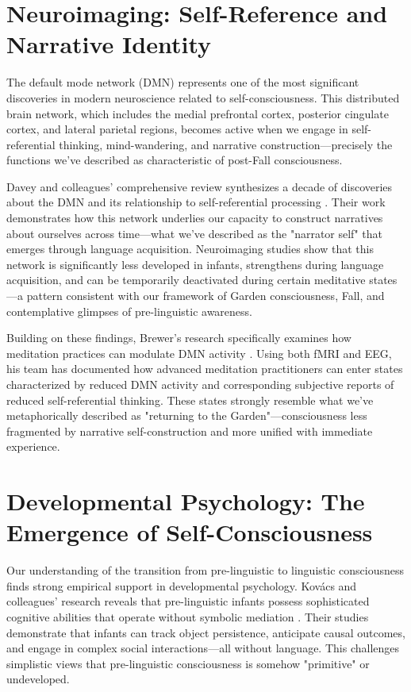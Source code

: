 \section{Neuroimaging: Self-Reference and Narrative Identity}

The default mode network (DMN) represents one of the most significant discoveries in modern neuroscience related to self-consciousness. This distributed brain network, which includes the medial prefrontal cortex, posterior cingulate cortex, and lateral parietal regions, becomes active when we engage in self-referential thinking, mind-wandering, and narrative construction—precisely the functions we've described as characteristic of post-Fall consciousness.

Davey and colleagues' comprehensive review synthesizes a decade of discoveries about the DMN and its relationship to self-referential processing \parencite{davey2024default}. Their work demonstrates how this network underlies our capacity to construct narratives about ourselves across time—what we've described as the "narrator self" that emerges through language acquisition. Neuroimaging studies show that this network is significantly less developed in infants, strengthens during language acquisition, and can be temporarily deactivated during certain meditative states—a pattern consistent with our framework of Garden consciousness, Fall, and contemplative glimpses of pre-linguistic awareness.

Building on these findings, Brewer's research specifically examines how meditation practices can modulate DMN activity \parencite{brewer2024meditation}. Using both fMRI and EEG, his team has documented how advanced meditation practitioners can enter states characterized by reduced DMN activity and corresponding subjective reports of reduced self-referential thinking. These states strongly resemble what we've metaphorically described as "returning to the Garden"—consciousness less fragmented by narrative self-construction and more unified with immediate experience.

\section{Developmental Psychology: The Emergence of Self-Consciousness}

Our understanding of the transition from pre-linguistic to linguistic consciousness finds strong empirical support in developmental psychology. Kovács and colleagues' research reveals that pre-linguistic infants possess sophisticated cognitive abilities that operate without symbolic mediation \parencite{kovacs2024prelinguistic}. Their studies demonstrate that infants can track object persistence, anticipate causal outcomes, and engage in complex social interactions—all without language. This challenges simplistic views that pre-linguistic consciousness is somehow "primitive" or undeveloped.

